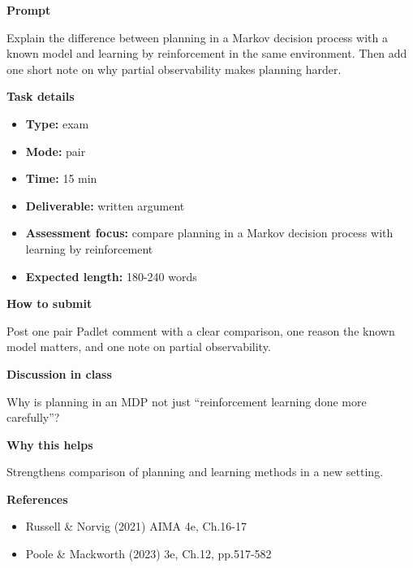 \documentclass[11pt]{article}
\begin{document}
\begin{tcolorbox}[colback=white,colframe=MidnightBlue,title={Q5 Exam-Style Constructed Response},fonttitle=\bfseries,breakable]
\begin{center}
\end{center}

{\large\bfseries\color{MidnightBlue} Prompt}\par\medskip
Explain the difference between planning in a Markov decision process with a known model and learning by reinforcement in the same environment. Then add one short note on why partial observability makes planning harder.

{\large\bfseries\color{MidnightBlue} Task details}\par\medskip
\begin{itemize}\item \textbf{Type:} exam
\item \textbf{Mode:} pair
\item \textbf{Time:} 15 min
\item \textbf{Deliverable:} written argument
\item \textbf{Assessment focus:} compare planning in a Markov decision process with learning by reinforcement
\item \textbf{Expected length:} 180-240 words\end{itemize}

{\large\bfseries\color{MidnightBlue} How to submit}\par\medskip
Post one pair Padlet comment with a clear comparison, one reason the known model matters, and one note on partial observability.

{\large\bfseries\color{MidnightBlue} Discussion in class}\par\medskip
Why is planning in an MDP not just ``reinforcement learning done more carefully''?

{\large\bfseries\color{MidnightBlue} Why this helps}\par\medskip
Strengthens comparison of planning and learning methods in a new setting.

{\large\bfseries\color{MidnightBlue} References}\par\medskip
\begin{itemize}\item Russell \& Norvig (2021) AIMA 4e, Ch.16-17
\item Poole \& Mackworth (2023) 3e, Ch.12, pp.517-582\end{itemize}
\end{tcolorbox}
\end{document}
